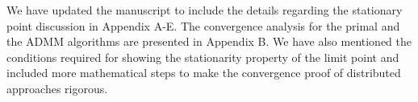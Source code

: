 \begin{enumerate}
 

\resp We have updated the manuscript to include the details regarding the stationary point discussion in Appendix A-E. The convergence analysis for the primal and the \ac{ADMM} algorithms are presented in Appendix B. We have also mentioned the conditions required for showing the stationarity property of the limit point and included more mathematical steps to make the convergence proof of distributed approaches rigorous.

\end{enumerate}
